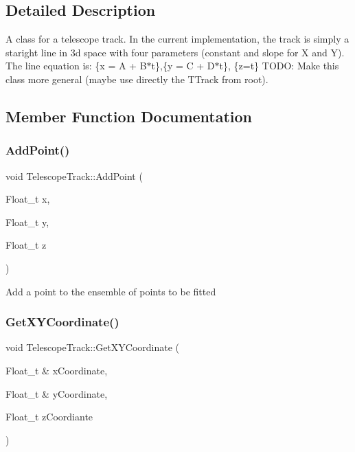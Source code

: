 \subsection{Detailed Description}
A class for a telescope track. In the current implementation, the track is simply a staright line in 3d space with four parameters (constant and slope for X and Y). The line equation is\+: \{x = A + B$\ast$t\},\{y = C + D$\ast$t\}, \{z=t\} T\+O\+DO\+: Make this class more general (maybe use directly the T\+Track from root). 

\subsection{Member Function Documentation}
\mbox{\label{class_telescope_track_afb3be5a992879f15abfb90906fd70856}} 
\subsubsection{\texorpdfstring{Add\+Point()}{AddPoint()}}
{\footnotesize\ttfamily void Telescope\+Track\+::\+Add\+Point (\begin{DoxyParamCaption}\item[{Float\+\_\+t}]{x,  }\item[{Float\+\_\+t}]{y,  }\item[{Float\+\_\+t}]{z }\end{DoxyParamCaption})}

Add a point to the ensemble of points to be fitted \mbox{\label{class_telescope_track_a6ab532f538116f6cdc97a4258b667d03}} 
\subsubsection{\texorpdfstring{Get\+X\+Y\+Coordinate()}{GetXYCoordinate()}}
{\footnotesize\ttfamily void Telescope\+Track\+::\+Get\+X\+Y\+Coordinate (\begin{DoxyParamCaption}\item[{Float\+\_\+t \&}]{x\+Coordinate,  }\item[{Float\+\_\+t \&}]{y\+Coordinate,  }\item[{Float\+\_\+t}]{z\+Coordiante }\end{DoxyParamCaption})}

